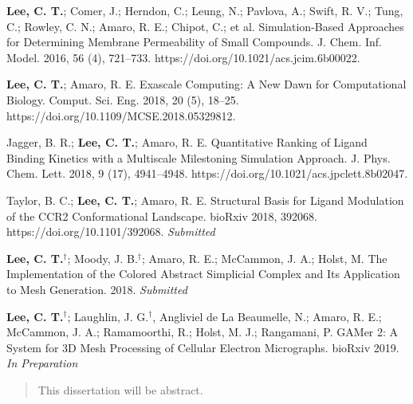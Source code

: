 \begin{frontmatter}
\begin{vitapage}
\begin{publications}
  \item \textbf{Lee, C. T.}; Comer, J.; Herndon, C.; Leung, N.; Pavlova, A.; Swift, R. V.; Tung, C.; Rowley, C. N.; Amaro, R. E.; Chipot, C.; et al. Simulation-Based Approaches for Determining Membrane Permeability of Small Compounds. J. Chem. Inf. Model. 2016, 56 (4), 721–733. https://doi.org/10.1021/acs.jcim.6b00022.
  \item \textbf{Lee, C. T.}; Amaro, R. E. Exascale Computing: A New Dawn for Computational Biology. Comput. Sci. Eng. 2018, 20 (5), 18–25. https://doi.org/10.1109/MCSE.2018.05329812.
  \item Jagger, B. R.; \textbf{Lee, C. T.}; Amaro, R. E. Quantitative Ranking of Ligand Binding Kinetics with a Multiscale Milestoning Simulation Approach. J. Phys. Chem. Lett. 2018, 9 (17), 4941–4948. https://doi.org/10.1021/acs.jpclett.8b02047.
  \item Taylor, B. C.; \textbf{Lee, C. T.}; Amaro, R. E. Structural Basis for Ligand Modulation of the CCR2 Conformational Landscape. bioRxiv 2018, 392068. https://doi.org/10.1101/392068. \textit{Submitted}
  \item \textbf{Lee, C. T.$^{\dagger}$}; Moody, J. B.$^{\dagger}$; Amaro, R. E.; McCammon, J. A.; Holst, M. The Implementation of the Colored Abstract Simplicial Complex and Its Application to Mesh Generation. 2018. \textit{Submitted}
  \item \textbf{Lee, C. T.$^{\dagger}$}; Laughlin, J. G.$^{\dagger}$, Angliviel de La Beaumelle, N.; Amaro, R. E.; McCammon, J. A.; Ramamoorthi, R.; Holst, M. J.; Rangamani, P. GAMer 2: A System for 3D Mesh Processing of Cellular Electron Micrographs. bioRxiv 2019. \textit{In Preparation}
\end{publications}
\end{vitapage}

%
%
\begin{abstract}
  This dissertation will be abstract.
\end{abstract}

\end{frontmatter}

